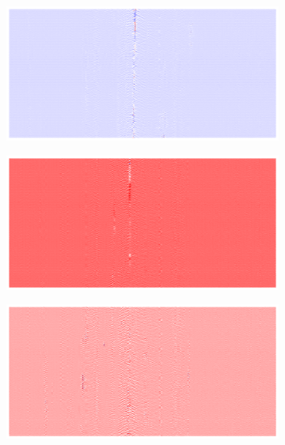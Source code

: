 \begin{figure}[!h]
    \begin{subfigure}{0.33\textwidth}
        \includegraphics[width=\textwidth]{figures/anomalies/cae/20190415_031735.png}
    \end{subfigure}%
    \hfill
    \begin{subfigure}{0.33\textwidth}
        \includegraphics[width=\textwidth]{figures/anomalies/cae/20190415_031750.png}
    \end{subfigure}%
    \hfill
    \begin{subfigure}{0.33\textwidth}
        \includegraphics[width=\textwidth]{figures/anomalies/cae/20190415_031755.png}
    \end{subfigure}
    

\end{figure}
